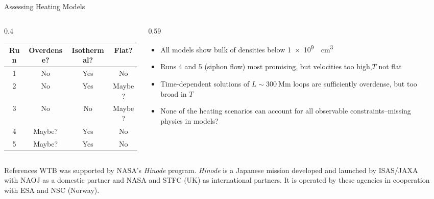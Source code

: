 \documentclass[final]{beamer}
\newlength{\sepwidth}
\newlength{\colwidth}
\newcommand{\separatorcolumn}{\begin{column}{\sepwidth}\end{column}}
\begin{document}
\begin{frame}[t]
\begin{columns}[t]
\begin{column}{\colwidth}
\begin{block}{Assessing Heating Models}
    \begin{columns}[c]
      \begin{column}{0.4\colwidth}
        \begin{table}
          \centering
          \begin{tabular}{c c c c}
            \toprule
            \textbf{Run} & \textbf{Overdense?} & \textbf{Isothermal?} & \textbf{Flat?} \\
            \midrule
            1 & No & Yes &  No \\
            2 & No & Yes & Maybe? \\
            3 & No & No &  Maybe? \\
            4 & Maybe? & Yes &  No \\
            5 & Maybe? & Yes & No \\
            \bottomrule
          \end{tabular}
        \end{table}    
      \end{column}
      \begin{column}{0.59\colwidth}
        \begin{itemize}
          \item All models show bulk of densities below \SI{1e9}{\per\cubic\cm}
          \item Runs 4 and 5 (siphon flow) most promising, but \alert{velocities too high,$T$ not flat}
          \item Time-dependent solutions of $L\sim\SI{300}{\mega\m}$ loops are sufficiently overdense, but too broad in $T$
          \item \alert{None of the heating scenarios can account for all observable constraints}--missing physics in models?
        \end{itemize}
      \end{column}
    \end{columns}

  \end{block}

  \begin{block}{References}
    \tiny
    WTB was supported by NASA's \textit{Hinode} program.
    \textit{Hinode} is a Japanese mission developed and launched by ISAS/JAXA with NAOJ as a domestic partner and NASA and STFC (UK) as international partners.
    It is operated by these agencies in cooperation with ESA and NSC (Norway).
    \begin{multicols}{2}
      
      
    \end{multicols}
  \end{block}

\end{column}

\separatorcolumn
\end{columns}
\end{frame}
\end{document}
